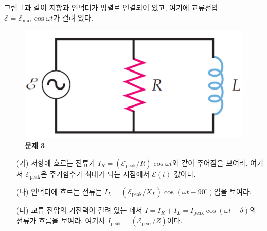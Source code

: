 \documentclass[tightenlines,floatfix,nofootinbib,superscriptaddress,fleqn]{revtex4}
\begin{document}
그림~\ref{fig:3}과 같이 저항과 인덕터가 병렬로 연결되어 있고, 여기에
교류전압 $\mathcal{E}=\mathcal{E}_{\mathrm{max}}\cos\omega t$가 걸려
있다. 
\begin{figure}[htp]
  \centering
  \includegraphics[scale=0.4]{qfig11-20221024-1.pdf}
  \caption{\textbf{문제 3}}
  \label{fig:3}
\end{figure}
\begin{itemize}
\item[(가)] 저항에 흐르는 전류가 
$I_R=(\mathcal{E}_{\mathrm{peak}}/R)\cos\omega t$와 같이 주어짐을
보여라. 여기서 $\mathcal{E}_{\mathrm{peak}}$은 주기함수가 최대가 되는
지점에서 $\mathcal{E}(t)$ 값이다. 
\item[(나)] 인덕터에 흐르는 전류는
  $I_L=(\mathcal{E}_{\mathrm{peak}}/X_L)\cos(\omega t -90^\circ)$임을
  보여라. 
\item[(다)] 교류 전압의 기전력이 걸려 있는 데서 
  $I=I_R+I_L=I_{\mathrm{peak}} \cos(\omega t-\delta)$의 전류가 흐름을
  보여라. 여기서
  $I_{\mathrm{peak}}=(\mathcal{E}_{\mathrm{peak}}/Z)$이다. 
\end{itemize}
\end{document}
